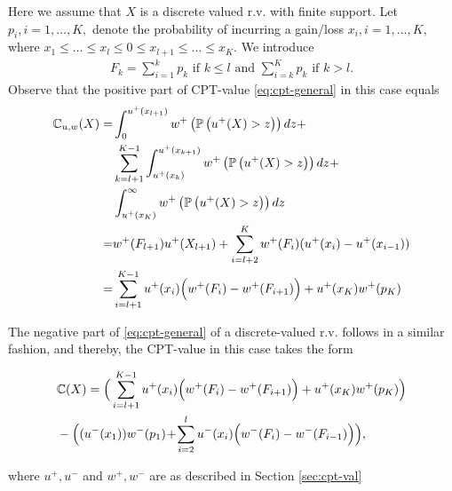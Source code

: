 Here we assume that $X$ is a discrete valued r.v. with finite support. 
Let $p_i, i=1,\ldots,K,$ denote the probability of incurring a gain/loss $x_i, i=1,\ldots,K$, where 
$x_1\le \ldots \le x_l \le 0 \le x_{l+1} \le \ldots \le x_K$. We introduce
\begin{align}
\label{eq:Fk}
 F_k = 
   \sum_{i=1}^k p_k  \text{ if   } k \leq l \text{ and }
   \sum_{i=k}^K p_k  \text{ if  }  k > l.
\end{align}
Observe that the positive part of CPT-value \eqref{eq:cpt-general} in this case equals
\begin{align}
\label{eq:discrete-integral}
\mathbb{C}_{u,w}(X)  = & \int_0^{u^+(x_{l+1})} w^+\left(\mathbb{P}\left( u^+(X)>z \right)\right) dz +  \nonumber \\
&\sum_{k=l+1}^{K-1}\int_{u^+(x_{k})}^{u^+(x_{k+1})} w^+\left(\mathbb{P}\left( u^+(X)>z \right)\right) dz + \nonumber\\
&\int_{u^+(x_{K})}^\infty w^+\left(\mathbb{P}\left( u^+(X)>z \right)\right)  dz \nonumber\\
= &w^+(F_{l+1}) u^+(X_{l+1})+\sum_{i=l+2}^K w^+(F_i)(u^+(x_i) - u^+(x_{i-1})) \nonumber\\
= &\sum_{i=l+1}^{K-1} u^+(x_i) \Big(w^+(F_i) - w^+(F_{i+1})\Big)
 + u^+(x_K) w^+(p_K)
\end{align}

The negative part of \eqref{eq:cpt-general} of a discrete-valued r.v. follows in a similar fashion, and thereby, 
the CPT-value in this case takes the form
\begin{small}
\begin{align*}
&\mathbb{C}(X)= \Big(\sum_{i=l+1}^{K-1} u^+(x_i) \Big(w^+(F_i) - w^+(F_{i+1})\Big)
 + u^+(x_K) w^+(p_K)\Big)\\
& -\Big((u^-(x_1)) w^-(p_1) 
\!+\!\sum_{i=2}^l u^-(x_i) \Big(w^-(F_i) - w^-(F_{i-1})\Big)\Big),
\end{align*} 
\end{small}
where $u^+, u^-$ and $w^+, w^-$ are as described in Section \ref{sec:cpt-val}

